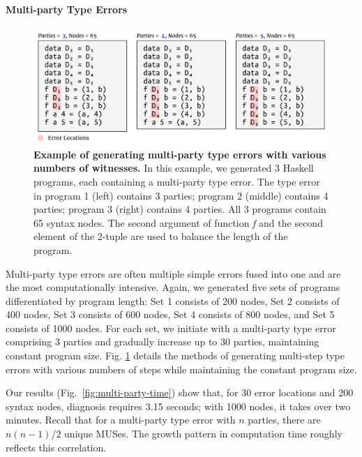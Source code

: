 \documentclass[pdflatex,lineno,sn-nature,Numbered]{sn-jnl}%
\begin{document}
\paragraph{Multi-party Type Errors}

\begin{figure}[ht]
    \centering
    \includegraphics[width=\linewidth]{images/MultiPartyMutation}
    \caption{{\bf Example of generating multi-party type errors with various numbers of witnesses.} In this example, we generated 3 Haskell programs, each containing a multi-party type error. The type error in program 1 (left) contains 3 parties; program 2 (middle) contains 4 parties; program 3 (right) contains 4 parties. All 3 programs contain 65 syntax nodes. The second argument of function {\it f} and the second element of the 2-tuple are used to balance the length of the program.}
    \label{fig:multi-party-mutation}
\end{figure}

Multi-party type errors are often multiple simple errors fused into one and are the most computationally intensive. Again, we generated five sets of programs differentiated by program length: Set 1 consists of 200 nodes, Set 2 consists of 400 nodes, Set 3 consists of 600 nodes, Set 4 consists of 800 nodes, and Set 5 consists of 1000 nodes. For each set, we initiate with a multi-party type error comprising 3 parties and gradually increase up to 30 parties, maintaining constant program size. Fig. \ref{fig:multi-party-mutation} details the methods of generating multi-step type errors with various numbers of steps while maintaining the constant program size.

Our results (Fig.~\ref{fig:multi-party-time}) show that, for 30 error locations and 200 syntax nodes, diagnosis requires 3.15 seconds; with 1000 nodes, it takes over two minutes. Recall that for a multi-party type error with $n$ parties, there are $n (n - 1) / 2$ unique MUSes. The growth pattern in computation time roughly reflects this correlation.
\end{document}

